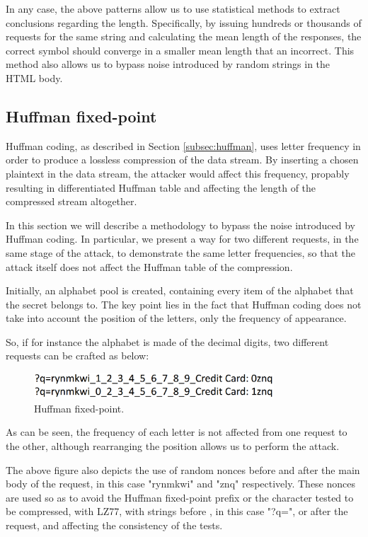 In any case, the above patterns allow us to use statistical methods to extract
conclusions regarding the length. Specifically, by issuing hundreds or thousands
of requests for the same string and calculating the mean length of the
responses, the correct symbol should converge in a smaller mean length that an
incorrect. This method also allows us to bypass noise introduced by random
strings in the HTML body.

\subsection{Huffman fixed-point}

Huffman coding, as described in Section \ref{subsec:huffman}, uses letter
frequency in order to produce a lossless compression of the data stream. By
inserting a chosen plaintext in the data stream, the attacker would affect this
frequency, propably resulting in differentiated Huffman table and affecting the
length of the compressed stream altogether.

In this section we will describe a methodology to bypass the noise introduced by
Huffman coding. In particular, we present a way for two different requests, in
the same stage of the attack, to demonstrate the same letter frequencies, so
that the attack itself does not affect the Huffman table of the compression.

Initially, an alphabet pool is created, containing every item of the alphabet
that the secret belongs to. The key point lies in the fact that Huffman coding
does not take into account the position of the letters, only the frequency of
appearance.

So, if for instance the alphabet is made of the decimal digits, two different
requests can be crafted as below:

\begin{figure}[H] \caption{Huffman fixed-point.} \centering
\includegraphics[width=0.8\textwidth]{diagrams/huffman_fixed_point.png}\end{figure}

As can be seen, the frequency of each letter is not affected from one request to
the other, although rearranging the position allows us to perform the attack.

The above figure also depicts the use of random nonces before and after the main
body of the request, in this case "rynmkwi" and "znq" respectively. These nonces
are used so as to avoid the Huffman fixed-point prefix or the character tested
to be compressed, with LZ77, with strings before , in this case "?q=", or after
the request, and affecting the consistency of the tests.

